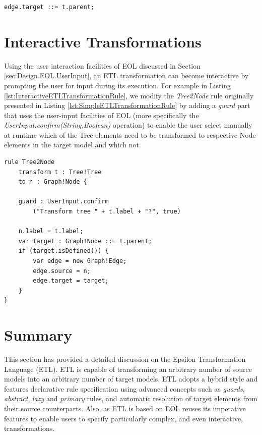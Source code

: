 \begin{lstlisting}[basicstyle=\ttfamily\footnotesize, flexiblecolumns=true, numbers=none, nolol=true, caption=Rewritten Line 10 of the \emph{Tree2Node} Rule Demonstrated in Listing \ref{lst:SimpleETLTransformationRule}, label=lst:SpecialAssignmentETLTransformationRule, numbers=left, language=ETL, tabsize=2]
edge.target ::= t.parent;
\end{lstlisting}


\section{Interactive Transformations}
\label{sec:InteractiveModelTransformation}

Using the user interaction facilities of EOL discussed in Section \ref{sec:Design.EOL.UserInput}, an ETL transformation can become interactive by prompting the user for input during its execution. For example in Listing \ref{lst:InteractiveETLTransformationRule}, we modify the \emph{Tree2Node} rule originally presented in Listing \ref{lst:SimpleETLTransformationRule} by adding a \emph{guard} part that uses the user-input facilities of EOL (more specifically the \emph{UserInput.confirm(String,Boolean)} operation) to enable the user select manually at runtime which of the Tree elements need to be transformed to respective Node elements in the target model and which not. 

\begin{lstlisting}[basicstyle=\ttfamily\footnotesize, flexiblecolumns=true, numbers=none, nolol=true, caption=Exemplar Interactive ETL Transformation, label=lst:InteractiveETLTransformationRule, numbers=left, language=ETL, tabsize=2]
rule Tree2Node
	transform t : Tree!Tree
	to n : Graph!Node {
	
	guard : UserInput.confirm
		("Transform tree " + t.label + "?", true)
	
	n.label = t.label;
	var target : Graph!Node ::= t.parent;
	if (target.isDefined()) {
		var edge = new Graph!Edge;
		edge.source = n;
		edge.target = target;
	}
}
\end{lstlisting}

\section{Summary}

This section has provided a detailed discussion on the Epsilon Transformation Language (ETL). ETL is capable of transforming an arbitrary number of source models into an arbitrary number of target models. ETL adopts a hybrid style and features declarative rule specification using advanced concepts such as \emph{guards}, \emph{abstract}, \emph{lazy} and \emph{primary} rules, and automatic resolution of target elements from their source counterparts. Also, as ETL is based on EOL reuses its imperative features to enable users to specify particularly complex, and even interactive, transformations.